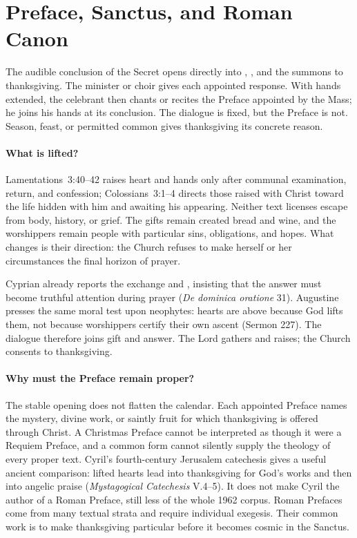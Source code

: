\section{Preface, Sanctus, and Roman Canon}


The audible conclusion of the Secret opens directly into , , and the summons to thanksgiving. The minister or choir gives each appointed response. With hands extended, the celebrant then chants or recites the Preface appointed by the Mass; he joins his hands at its conclusion. The dialogue is fixed, but the Preface is not. Season, feast, or permitted common gives thanksgiving its concrete reason.

\paragraph{What is lifted?}
Lamentations~3:40--42 raises heart and hands only after communal examination, return, and confession; Colossians~3:1--4 directs those raised with Christ toward the life hidden with him and awaiting his appearing. Neither text licenses escape from body, history, or grief. The gifts remain created bread and wine, and the worshippers remain people with particular sins, obligations, and hopes. What changes is their direction: the Church refuses to make herself or her circumstances the final horizon of prayer.

Cyprian already reports the exchange  and , insisting that the answer must become truthful attention during prayer (\emph{De dominica oratione} 31). Augustine presses the same moral test upon neophytes: hearts are above because God lifts them, not because worshippers certify their own ascent (Sermon 227). The dialogue therefore joins gift and answer. The Lord gathers and raises; the Church consents to thanksgiving.

\paragraph{Why must the Preface remain proper?}
The stable opening  does not flatten the calendar. Each appointed Preface names the mystery, divine work, or saintly fruit for which thanksgiving is offered through Christ. A Christmas Preface cannot be interpreted as though it were a Requiem Preface, and a common form cannot silently supply the theology of every proper text. Cyril's fourth-century Jerusalem catechesis gives a useful ancient comparison: lifted hearts lead into thanksgiving for God's works and then into angelic praise (\emph{Mystagogical Catechesis} V.4--5). It does not make Cyril the author of a Roman Preface, still less of the whole 1962 corpus. Roman Prefaces come from many textual strata and require individual exegesis. Their common work is to make thanksgiving particular before it becomes cosmic in the Sanctus.

